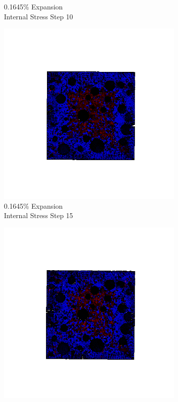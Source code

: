 \begin{figure}[ht!]
\begin{subfigure}{.25\textwidth}
      \caption{0.1645\% Expansion\\Internal Stress Step 10}
    \end{subfigure}%
    \begin{subfigure}{.25\textwidth}
      \centering
      \includegraphics[width=1.0\linewidth]{Files/exp_3D/DEF/A15X0C_1_s15.png}
      \caption{0.1645\% Expansion\\Internal Stress Step 15}
    \end{subfigure}%
    \begin{subfigure}{.25\textwidth}
      \centering
      \includegraphics[width=1.0\linewidth]{Files/exp_3D/DEF/A15X0C_1_stress.png}

\end{subfigure}
\end{figure}
